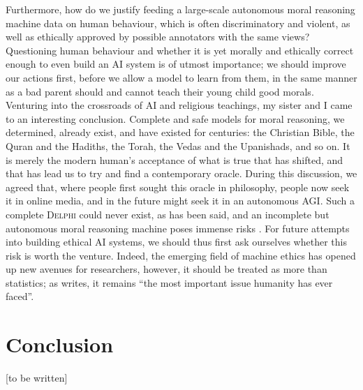 \documentclass[final]{clv3} %
\begin{document}
Furthermore, how do we justify feeding a large-scale autonomous moral reasoning machine data on human behaviour, which is often discriminatory and violent, as well as ethically approved by possible annotators with the same views? Questioning human behaviour and whether it is yet morally and ethically correct enough to even build an AI system is of utmost importance; we should improve our actions first, before we allow a model to learn from them, in the same manner as a bad parent should and cannot teach their young child good morals.\\

Venturing into the crossroads of AI and religious teachings, my sister and I came to an interesting conclusion. Complete and safe models for moral reasoning, we determined, already exist, and have existed for centuries: the Christian Bible, the Quran and the Hadiths, the Torah, the Vedas and the Upanishads, and so on. It is merely the modern human’s acceptance of what is true that has shifted, and that has lead us to try and find a contemporary oracle. During this discussion, we agreed that, where people first sought this oracle in philosophy, people now seek it in online media, and in the future might seek it in an autonomous AGI. Such a complete \textsc{Delphi} could never exist, as has been said, and an incomplete but autonomous moral reasoning machine poses immense risks \cite{tegmark}. For future attempts into building ethical AI systems, we should thus first ask ourselves whether this risk is worth the venture. Indeed, the emerging field of machine ethics has opened up new avenues for researchers, however,  it should be treated as more than statistics; as \citet{bostrom} writes, it remains “the most important issue humanity has ever faced”.\\

\section{Conclusion}

[to be written]


\end{document}

